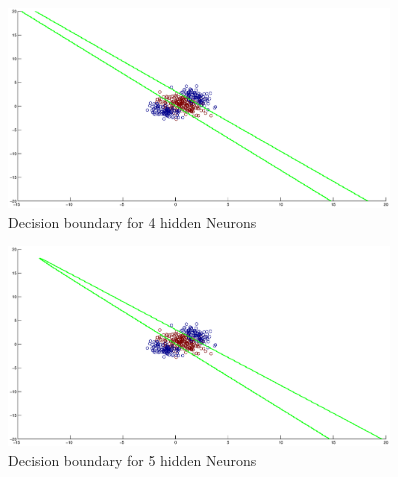 \documentclass[a4paper]{article}
\begin{document}
\begin{itemize}
			\begin{tcolorbox}
				\begin{figure}[H]
					\begin{center}
						\includegraphics[width=0.9\textwidth]{decisionboundary4.eps}
						\caption{ Decision boundary for 4 hidden Neurons }\label{fig:decisionbound-4}
					\end{center}
				\end{figure}
			\end{tcolorbox}

			\begin{tcolorbox}
				\begin{figure}[H]
					\begin{center}
						\includegraphics[width=0.9\textwidth]{decisionboundary5.eps}
						\caption{ Decision boundary for 5 hidden Neurons }\label{fig:decisionbound-5}
					\end{center}
				\end{figure}
			\end{tcolorbox}					


\end{itemize}
\end{document}
